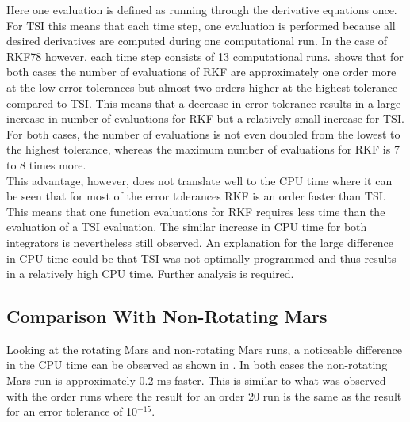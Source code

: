 \noindent
Here one evaluation is defined as running through the derivative equations once. For \ac{TSI} this means that each time step, one evaluation is performed because all desired derivatives are computed during one computational run. In the case of \ac{RKF78} however, each time step consists of 13 computational runs.  shows that for both cases the number of evaluations of \ac{RKF} are approximately one order more at the low error tolerances but almost two orders higher at the highest tolerance compared to \ac{TSI}. This means that a decrease in error tolerance results in a large increase in number of evaluations for \ac{RKF} but a relatively small increase for \ac{TSI}. For both cases, the number of evaluations is not even doubled from the lowest to the highest tolerance, whereas the maximum number of evaluations for \ac{RKF} is 7 to 8 times more. \\

\noindent
This advantage, however, does not translate well to the CPU time where it can be seen that for most of the error tolerances \ac{RKF} is an order faster than \ac{TSI}. This means that one function evaluations for \ac{RKF} requires less time than the evaluation of a \ac{TSI} evaluation. The similar increase in CPU time for both integrators is nevertheless still observed. An explanation for the large difference in CPU time could be that \ac{TSI} was not optimally programmed and thus results in a relatively high CPU time. Further analysis is required.


%


\subsection{Comparison With Non-Rotating Mars}
\label{subsec:errorToleranceCompNotRot}
Looking at the rotating Mars and non-rotating Mars runs, a noticeable difference in the CPU time can be observed as shown in . In both cases the non-rotating Mars run is approximately 0.2 ms faster. This is similar to what was observed with the order runs where the result for an order 20 run is the same as the result for an error tolerance of 10$^{-15}$.


